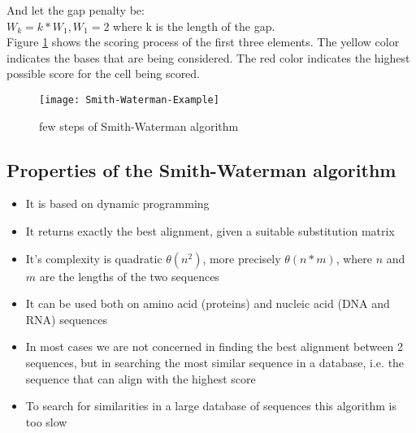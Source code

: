 And let the gap penalty be: \\

$W_k = k*W_1, W_1 = 2$ where k is the length of the gap. \\

Figure \ref{fig:steps} shows the scoring process of the first three elements.
The yellow color indicates the bases that are being considered.
The red color indicates the highest possible score for the cell being scored.

\begin{figure}[H]
  \centering
  \texttt{[image: Smith-Waterman-Example]}
  \caption{few steps of Smith-Waterman algorithm}
  \label{fig:steps}
\end{figure}

\subsection{Properties of the Smith-Waterman algorithm}

\begin{itemize}
  \item It is based on dynamic programming
  \item It returns exactly the best alignment, given a suitable substitution
 matrix
  \item It's complexity is quadratic $\theta(n^2)$, more precisely
$\theta(n*m)$, where $n$ and $m$ are the lengths of the two sequences
  \item It can be used both on amino acid (proteins) and nucleic acid (DNA and
RNA) sequences
  \item In most cases we are not concerned in finding the best alignment
between 2 sequences, but in searching the most similar sequence in a database,
i.e. the sequence that can align with the highest score
  \item To search for similarities in a large database of sequences this
algorithm is too slow
\end{itemize}
